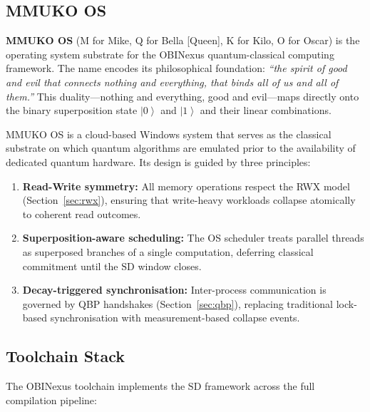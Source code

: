 \documentclass[12pt, a4paper]{article}
\theoremstyle{plain}
\theoremstyle{definition}
\theoremstyle{remark}
\newcommand{\ket}[1]{\left| #1 \right\rangle}
\newcommand{\SD}{\ensuremath{\mathrm{SD}}}   %
\begin{document}
\subsection{MMUKO OS}

\textbf{MMUKO OS} (M for Mike, Q for Bella [Queen], K for Kilo, O for Oscar)
is the operating system substrate for the OBINexus quantum-classical computing
framework.  The name encodes its philosophical foundation: \emph{``the spirit
of good and evil that connects nothing and everything, that binds all of us and
all of them.''} This duality---nothing and everything, good and evil---maps
directly onto the binary superposition state $\ket{0}$ and $\ket{1}$ and their
linear combinations.

MMUKO OS is a cloud-based Windows system that serves as the classical
substrate on which quantum algorithms are emulated prior to the availability
of dedicated quantum hardware.  Its design is guided by three principles:

\begin{enumerate}
  \item \textbf{Read-Write symmetry:}  All memory operations respect the RWX
        model (Section~\ref{sec:rwx}), ensuring that write-heavy workloads
        collapse atomically to coherent read outcomes.
  \item \textbf{Superposition-aware scheduling:}  The OS scheduler treats
        parallel threads as superposed branches of a single computation,
        deferring classical commitment until the \SD{} window closes.
  \item \textbf{Decay-triggered synchronisation:}  Inter-process
        communication is governed by QBP handshakes
        (Section~\ref{sec:qbp}), replacing traditional lock-based
        synchronisation with measurement-based collapse events.
\end{enumerate}

\subsection{Toolchain Stack}

The OBINexus toolchain implements the \SD{} framework across the full
compilation pipeline:
\end{document}
